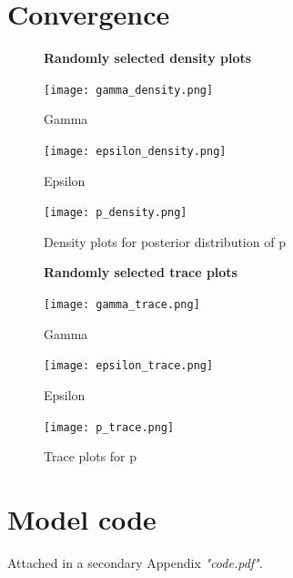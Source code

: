 \documentclass[12pt,a4paper]{article}
\begin{document}
\newpage
\begin{appendices}
\section{Convergence}

\begin{figure} [H]
  \centering
  \textbf{Randomly selected density plots}\par\medskip
  \begin{minipage}{.5\textwidth}
    \centering
    \texttt{[image: gamma\_density.png]}
    \caption{Gamma}
    \label{fig:Gamma density plots}
  \end{minipage}%
  \begin{minipage}{.5\textwidth}
    \centering
    \texttt{[image: epsilon\_density.png]}
    \caption{Epsilon}
    \label{fig:Epsilon density plots}
  \end{minipage}
\end{figure}

\begin{figure} [H]
  \begin{center}
      \texttt{[image: p\_density.png]}
      \label{fig:gamma density}
      \caption{Density plots for posterior distribution of p}
  \end{center}
\end{figure}

\begin{figure} [H]
  \centering
  \textbf{Randomly selected trace plots}\par\medskip
  \begin{minipage}{.5\textwidth}
    \centering
    \texttt{[image: gamma\_trace.png]}
    \caption{Gamma}
    \label{fig:Gamma trace plots}
  \end{minipage}%
  \begin{minipage}{.5\textwidth}
    \centering
    \texttt{[image: epsilon\_trace.png]}
    \caption{Epsilon}
    \label{fig:Epsilon trace plots}
  \end{minipage}
\end{figure}

\begin{figure} [H]
  \begin{center}
      \texttt{[image: p\_trace.png]}
      \label{fig:gamma trace}
      \caption{Trace plots for p}
  \end{center}
\end{figure}

\section{Model code}
Attached in a secondary Appendix \textit{"code.pdf"}.
\end{appendices}
\maketitle
\end{document}
